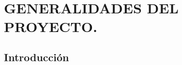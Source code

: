 \chapter{GENERALIDADES DEL PROYECTO.}
\newpage
\begin{center}
    \section*{Introducción}        
\end{center}
